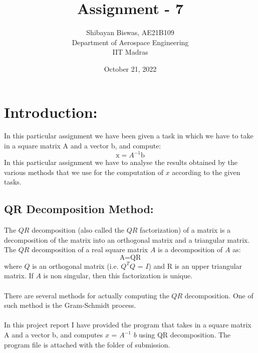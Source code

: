 \documentclass[12pt,a4paper]{article}
\author{ Shibayan Biswas, AE21B109\\ Department of Aerospace Engineering\\ IIT Madras}
\title{Assignment - 7}
\date{October 21, 2022}
\begin{document}
\maketitle
\hline
\section{Introduction:}
In this particular assignment we have been given a task in which we have to take in a square matrix A and a vector b, and compute:
\begin{equation}
    \text{x} = \text{$A^{-1}$} \text{b}
\end{equation}
In this particular assignment we have to analyse the results obtained by the various methods that we use for the computation of $x$ according to the given tasks.
\subsection{QR Decomposition Method:}
The $QR$ decomposition (also called the $QR$ factorization) of a matrix is a decomposition of the matrix into an orthogonal matrix and a triangular matrix. The $QR$ decomposition of a real square matrix $A$ is a decomposition of $A$ as:
\begin{equation}
    \text{A} = \text{Q} \text{R}
\end{equation}
where $Q$ is an orthogonal matrix (i.e. $Q^{T}Q$ = $I$) and R is an upper triangular matrix. If $A$ is non singular, then this factorization is unique.\\
\\There are several methods for actually computing the $QR$ decomposition. One of such method is the Gram-Schmidt process.\\
\\In this project report I have provided the program that takes in a square matrix A and a vector b, and computes $x$ = $A^{-1}$ $b$ using QR decomposition. The program file is attached with the folder of submission.
\clearpage
\end{document}
